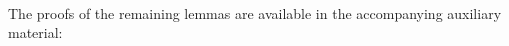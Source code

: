 \begin{AgdaAlign}
\begin{code}
\AgdaSymbol{(}\AgdaSpace{}%
\AgdaSymbol{(}\AgdaSpace{}%
\AgdaSymbol{)}\AgdaSpace{}%
\AgdaSpace{}%
\AgdaSymbol{)}\<%
\\
%
\>[6]\<%
\\
%
\>[6]\<%
\\
\>[6][@{}l@{\AgdaIndent{0}}]%
\>[8]\AgdaSpace{}%
\AgdaSymbol{=}\<%
\\
\>[8][@{}l@{\AgdaIndent{0}}]%
\>[10]\AgdaSpace{}%
\AgdaSpace{}%
\AgdaSymbol{(}\AgdaSpace{}%
\AgdaSpace{}%
\AgdaSpace{}%
\<%
\\
\>[10][@{}l@{\AgdaIndent{0}}]%
\>[12]\AgdaSpace{}%
\AgdaSpace{}%
\AgdaSpace{}%
\<%
\\
\>[12][@{}l@{\AgdaIndent{0}}]%
\>[14]\AgdaSpace{}%
\AgdaSpace{}%
\AgdaSpace{}%
\AgdaSymbol{((}\AgdaSpace{}%
\AgdaSymbol{)}\AgdaSpace{}%
\AgdaSymbol{))}\AgdaSpace{}%
\AgdaSymbol{(}\AgdaSpace{}%
\AgdaSpace{}%
\AgdaSpace{}%
\AgdaSpace{}%
\AgdaSpace{}%
\AgdaSymbol{))}\<%
\end{code}
\end{AgdaAlign}%
%
The proofs of the remaining lemmas are available in the accompanying auxiliary material:
%
